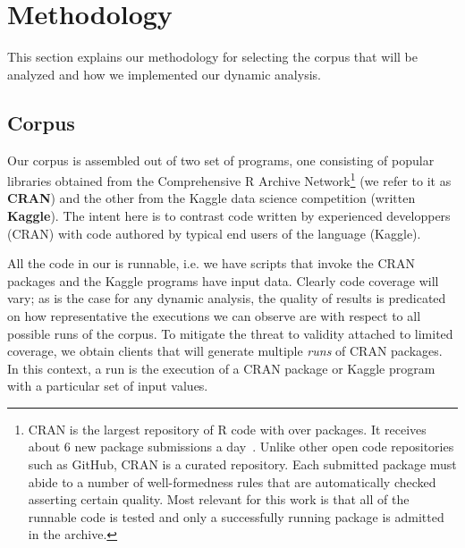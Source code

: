 \documentclass[USenglish,cleveref, autoref, thm-restate]{lipics-v2019}
\begin{document}
\section{Methodology}

This section explains our methodology for selecting the corpus that
will be analyzed and how we implemented our dynamic analysis.

\subsection{Corpus}

Our corpus is assembled out of two set of programs, one consisting of
popular libraries obtained from the Comprehensive R Archive
Network\footnote{CRAN is the largest repository of R code with over
\CorpusAllCranRnd packages. It receives about 6 new package
submissions a day~\cite{Ligges2017}. Unlike other open code
repositories such as GitHub, CRAN is a curated repository. Each
submitted package must abide to a number of well-formedness rules that
are automatically checked asserting certain quality. Most relevant for
this work is that all of the runnable code is tested and only a
successfully running package is admitted in the archive.} (we refer to
it as {\bf CRAN}) and the other from the Kaggle data science
competition (written {\bf Kaggle}). The intent here is to contrast
code written by experienced developpers (CRAN) with code authored by
typical end users of the language (Kaggle).

All the code in our is runnable, i.e. we have scripts that invoke the
CRAN packages and the Kaggle programs have input data. Clearly code
coverage will vary; as is the case for any dynamic analysis, the
quality of results is predicated on how representative the executions
we can observe are with respect to all possible runs of the corpus. To
mitigate the threat to validity attached to limited coverage, we
obtain clients that will generate multiple \emph{runs} of CRAN
packages. In this context, a run is the execution of a CRAN package or
Kaggle program with a particular set of input values.
\end{document}
